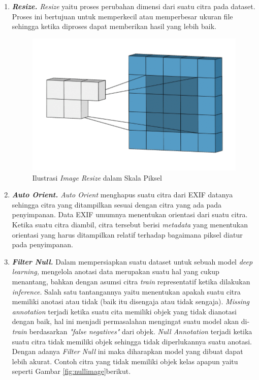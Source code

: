 \begin{enumerate}[nolistsep]
    \item \textit{\textbf{Resize.} Resize} yaitu proses perubahan dimensi dari suatu citra pada dataset. Proses ini bertujuan untuk memperkecil atau memperbesar ukuran file sehingga ketika diproses dapat memberikan hasil yang lebih baik. 
    \begin{figure}[H]
        \centering
        \includegraphics[scale=0.5]{gambar/imageresize.png}
        \caption{Ilustrasi \textit{Image Resize} dalam Skala Piksel}
        \label{fig:imageresize}
    \end{figure}

    \item \textit{\textbf{Auto Orient.} Auto Orient} menghapus suatu citra dari EXIF datanya sehingga citra yang ditampilkan sesuai dengan citra yang ada pada penyimpanan. Data EXIF umumnya menentukan orientasi dari suatu citra. Ketika suatu citra diambil, citra tersebut berisi \textit{metadata} yang menentukan orientasi yang harus ditampilkan relatif terhadap bagaimana piksel diatur pada penyimpanan.
    \item \textit{\textbf{Filter Null.}} Dalam mempersiapkan suatu dataset untuk sebuah model \textit{deep learning,} mengelola anotasi data merupakan suatu hal yang cukup menantang, bahkan dengan asumsi citra \textit{train} representatif ketika dilakukan \textit{inference.} Salah satu tantangannya yaitu menentukan apakah suatu citra memiliki anotasi atau tidak (baik itu disengaja atau tidak sengaja). \textit{Missing annotation} terjadi ketika suatu cita memiliki objek yang tidak dianotasi dengan baik, hal ini menjadi permasalahan mengingat suatu model akan di-\textit{train} berdasarkan \textit{"false negatives"} dari objek. \textit{Null Annotation} terjadi ketika suatu citra tidak memiliki objek sehingga tidak diperlukannya suatu anotasi. Dengan adanya \textit{Filter Null} ini maka diharapkan model yang dibuat dapat lebih akurat. Contoh citra yang tidak memiliki objek kelas apapun yaitu seperti Gambar \ref*{fig:nullimage}berikut.
    

\end{enumerate}
